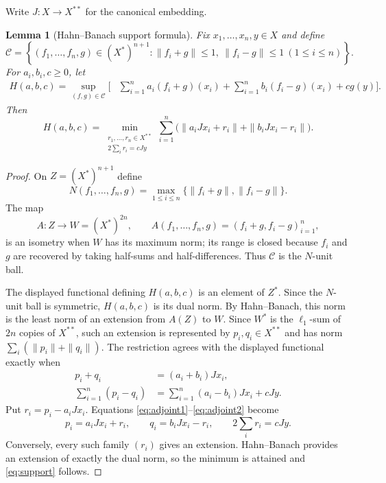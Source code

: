 \documentclass[11pt]{article}
\newtheorem{lemma}[theorem]{Lemma}
\newcommand{\J}{J}
\begin{document}
Write $\J:X\to X^{**}$ for the canonical embedding.

\begin{lemma}[Hahn--Banach support formula]\label{lem:support}
Fix $x_1,\ldots,x_n,y\in X$ and define
\[
 \mathcal C=
 \left\{(f_1,\ldots,f_n,g)\in(X^*)^{n+1}:
       \|f_i+g\|\le1,\ \|f_i-g\|\le1\ (1\le i\le n)\right\}.
\]
For $a_i,b_i,c\ge0$, let
\begin{align*}
 H(a,b,c)=\sup_{(f,g)\in\mathcal C}
 \bigg[&\sum_{i=1}^n a_i(f_i+g)(x_i)
       +\sum_{i=1}^n b_i(f_i-g)(x_i)+c g(y)\bigg].
\end{align*}
Then
\begin{equation}\label{eq:support}
 H(a,b,c)=
 \min_{\substack{r_1,\ldots,r_n\in X^{**}\\
                   2\sum_i r_i=c\J y}}
 \sum_{i=1}^n
 \bigl(\|a_i\J x_i+r_i\|+\|b_i\J x_i-r_i\|\bigr).
\end{equation}
\end{lemma}

\begin{proof}
On $Z=(X^*)^{n+1}$ define
\[
 N(f_1,\ldots,f_n,g)
 =\max_{1\le i\le n}\{\|f_i+g\|,\|f_i-g\|\}.
\]
The map
\[
 A:Z\longrightarrow W=(X^*)^{2n},\qquad
 A(f_1,\ldots,f_n,g)=(f_i+g,f_i-g)_{i=1}^n,
\]
is an isometry when $W$ has its maximum norm; its range is closed because
$f_i$ and $g$ are recovered by taking half-sums and half-differences.
Thus $\mathcal C$ is the $N$-unit ball.

The displayed functional defining $H(a,b,c)$ is an element of $Z^*$.
Since the $N$-unit ball is symmetric, $H(a,b,c)$ is its dual norm.
By Hahn--Banach, this norm is the least norm of an extension from
$A(Z)$ to $W$.  Since $W^*$ is the $\ell_1$-sum of $2n$ copies of $X^{**}$,
such an extension is represented by $p_i,q_i\in X^{**}$ and has norm
$\sum_i(\|p_i\|+\|q_i\|)$.  The restriction agrees with the displayed
functional exactly when
\begin{align}
 p_i+q_i&=(a_i+b_i)\J x_i,\label{eq:adjoint1}\\
 \sum_{i=1}^n(p_i-q_i)
 &=\sum_{i=1}^n(a_i-b_i)\J x_i+c\J y.\label{eq:adjoint2}
\end{align}
Put $r_i=p_i-a_i\J x_i$.  Equations
\eqref{eq:adjoint1}--\eqref{eq:adjoint2} become
\[
 p_i=a_i\J x_i+r_i,\qquad q_i=b_i\J x_i-r_i,
 \qquad 2\sum_i r_i=c\J y.
\]
Conversely, every such family $(r_i)$ gives an extension.  Hahn--Banach
provides an extension of exactly the dual norm, so the minimum is attained
and \eqref{eq:support} follows.
\end{proof}
\end{document}
